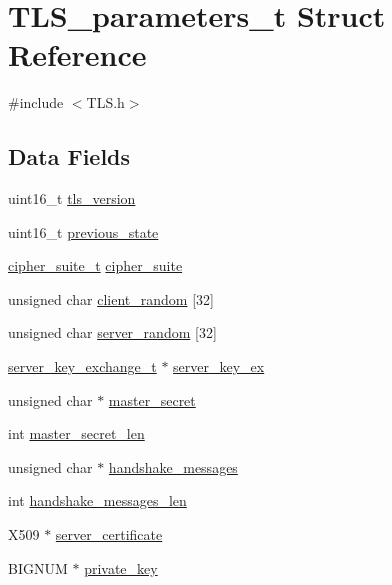 \hypertarget{struct_t_l_s__parameters__t}{}\section{T\+L\+S\+\_\+parameters\+\_\+t Struct Reference}
\label{struct_t_l_s__parameters__t}


{\ttfamily \#include $<$T\+L\+S.\+h$>$}

\subsection*{Data Fields}
\begin{DoxyCompactItemize}
\item 
uint16\+\_\+t \hyperlink{struct_t_l_s__parameters__t_a8fd63193690a09b75e0aaf9b971ed3df}{tls\+\_\+version}
\item 
uint16\+\_\+t \hyperlink{struct_t_l_s__parameters__t_a7876cd7f12771bb13dfd180e2d74e02b}{previous\+\_\+state}
\item 
\hyperlink{structcipher__suite__t}{cipher\+\_\+suite\+\_\+t} \hyperlink{struct_t_l_s__parameters__t_af1d8ebe57a775be2b91550dbcacb2a58}{cipher\+\_\+suite}
\item 
unsigned char \hyperlink{struct_t_l_s__parameters__t_adbdca8d573a8e073ef16bf14229fb4c9}{client\+\_\+random} \mbox{[}32\mbox{]}
\item 
unsigned char \hyperlink{struct_t_l_s__parameters__t_a9159f146fbc286a8b55f4aa83396ae2f}{server\+\_\+random} \mbox{[}32\mbox{]}
\item 
\hyperlink{_server_client_key_exchange_8h_a0e7e73056ef40d5a7b303b385dee59cd}{server\+\_\+key\+\_\+exchange\+\_\+t} $\ast$ \hyperlink{struct_t_l_s__parameters__t_ad79527a4a6a3547cc16f0fb569767d9d}{server\+\_\+key\+\_\+ex}
\item 
unsigned char $\ast$ \hyperlink{struct_t_l_s__parameters__t_a68c2015df5cb7259aa1abdee33c8e6f3}{master\+\_\+secret}
\item 
int \hyperlink{struct_t_l_s__parameters__t_a7112487b636ca7921055d94ae02478fe}{master\+\_\+secret\+\_\+len}
\item 
unsigned char $\ast$ \hyperlink{struct_t_l_s__parameters__t_ac6734c87e703c22f7d34f71ca116d005}{handshake\+\_\+messages}
\item 
int \hyperlink{struct_t_l_s__parameters__t_afbdbb7d32255aef8951f95ccc44957fc}{handshake\+\_\+messages\+\_\+len}
\item 
X509 $\ast$ \hyperlink{struct_t_l_s__parameters__t_a832ae425d6bb6330e1e5e825ab85ac31}{server\+\_\+certificate}
\item 
B\+I\+G\+N\+UM $\ast$ \hyperlink{struct_t_l_s__parameters__t_aa7d109714bb4c1faa6aba18c0dd3dcae}{private\+\_\+key}
\end{DoxyCompactItemize}



